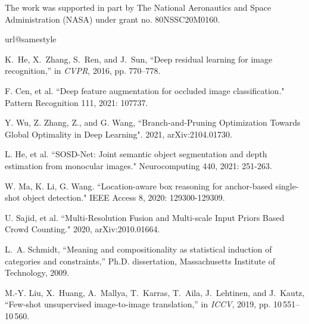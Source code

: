 \documentclass[10pt, conference, compsocconf]{IEEEtran}
\begin{document}
The work was supported in part by The National Aeronautics and Space Administration (NASA) under grant no. 80NSSC20M0160.

\begin{thebibliography}{10}\setlength\itemsep{0.28em}
\csname url@samestyle\endcsname
\providecommand{\newblock}{\relax}
\providecommand{\bibinfo}[2]{#2}
\providecommand{\BIBentrySTDinterwordspacing}{\spaceskip=0pt\relax}
\providecommand{\BIBentryALTinterwordstretchfactor}{4}
\providecommand{\BIBentryALTinterwordspacing}{\spaceskip=\fontdimen2\font plus
\BIBentryALTinterwordstretchfactor\fontdimen3\font minus
  \fontdimen4\font\relax}
\providecommand{\BIBforeignlanguage}[2]{{\expandafter\ifx\csname l@#1\endcsname\relax
\typeout{** WARNING: IEEEtran.bst: No hyphenation pattern has been}\typeout{** loaded for the language `#1'. Using the pattern for}\typeout{** the default language instead.}\else
\language=\csname l@#1\endcsname
\fi
#2}}
\providecommand{\BIBdecl}{\relax}
\BIBdecl

K.~He, X.~Zhang, S.~Ren, and J.~Sun, ``Deep residual learning for image
  recognition,'' in \emph{CVPR}, 2016, pp. 770--778.

F. Cen, et al. ``Deep feature augmentation for occluded image classification." Pattern Recognition 111, 2021: 107737.

Y. Wu, Z. Zhang, Z., and G. Wang, ``Branch-and-Pruning Optimization Towards Global Optimality in Deep Learning". 2021, arXiv:2104.01730.

L. He, et al. ``SOSD-Net: Joint semantic object segmentation and depth estimation from monocular images." Neurocomputing 440, 2021: 251-263.

W. Ma, K. Li, G. Wang. ``Location-aware box reasoning for anchor-based single-shot object detection." IEEE Access 8, 2020: 129300-129309.

U. Sajid, et al. ``Multi-Resolution Fusion and Multi-scale Input Priors Based Crowd Counting." 2020, arXiv:2010.01664.

L.~A. Schmidt, ``Meaning and compositionality as statistical induction of
  categories and constraints,'' Ph.D. dissertation, Massachusetts Institute of
  Technology, 2009.

M.-Y. Liu, X.~Huang, A.~Mallya, T.~Karras, T.~Aila, J.~Lehtinen, and J.~Kautz,
  ``Few-shot unsupervised image-to-image translation,'' in \emph{ICCV}, 2019,
  pp. 10\,551--10\,560.


\end{thebibliography}
\end{document}
